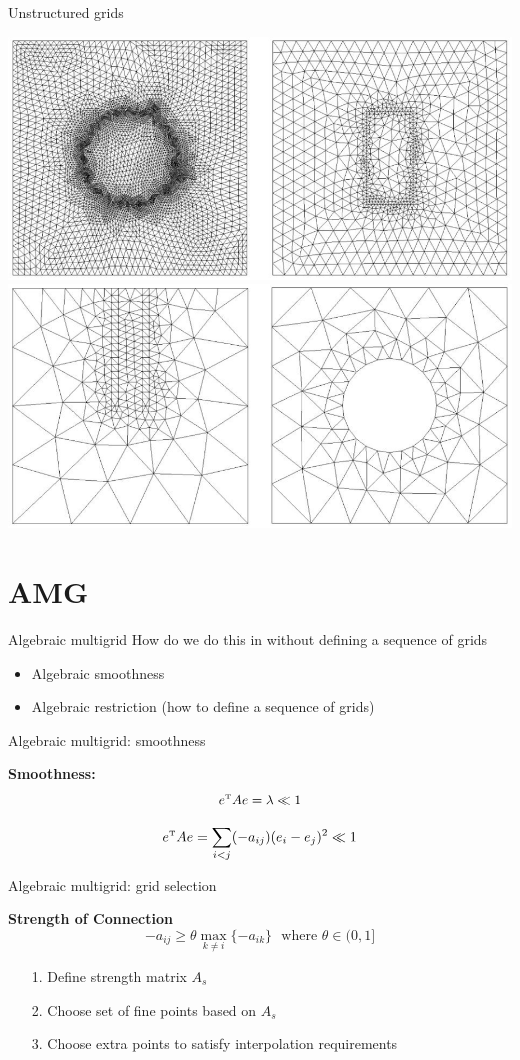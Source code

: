 \documentclass[12pt]{beamer}
\begin{document}
\begin{frame}{Unstructured grids}
\begin{centering}

\includegraphics[width=.5\textwidth]{Grid1}\\

\includegraphics[width=.5\textwidth]{Grid2}

\end{centering}

\end{frame}

\section{AMG}
\begin{frame}{Algebraic multigrid}
How do we do this in without defining a sequence of grids

\begin{itemize}
  \item Algebraic smoothness
  \item Algebraic restriction (how to define a sequence of grids)
\end{itemize}
\end{frame}





\begin{frame}{Algebraic multigrid: smoothness}

\textbf{Smoothness:}
$$e^{\mbox{\tiny{T}}}Ae = \lambda \ll 1$$


$$e^{\mbox{\tiny{T}}}Ae = \sum_{i<j} (-a_{ij})(e_i-e_j)^2 \ll 1$$



\end{frame}


\begin{frame}{Algebraic multigrid: grid selection}

\textbf{Strength of Connection}
$$-a_{ij}\geq \theta \max_{k\neq i} \{-a_{ik}\} \ \ \ \mbox{where } \theta \in (0,1]$$

\begin{itemize}
  \item[1.] Define strength matrix $A_s$
  \item[2.] Choose set of fine points based on $A_s$
  \item[3.] Choose extra points to satisfy interpolation requirements
\end{itemize}

\end{frame}
\end{document}
